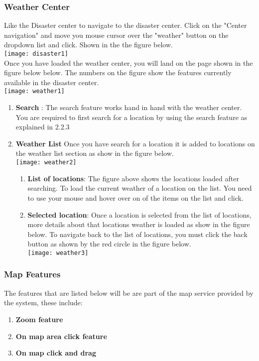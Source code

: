 \subsubsection{Weather Center}
Like the Disaster center to navigate to the disaster center. Click on the "Center navigation" and move you mouse cursor over the "weather" button on the dropdown list and click. Shown in the the figure below. \\[0.5cm]
\texttt{[image: disaster1]} \\[0.5cm]
Once you have loaded the weather center, you will land on the page shown in the figure below below. The numbers on the figure show the features currently available in the disaster center. \\[0.5cm]
\texttt{[image: weather1]} \\[0.5cm]
	\begin{enumerate}
		\item \textbf{Search} : The search feature works hand in hand with the weather center. You are required to first search for a location by using the search feature as explained in 2.2.3
		\item \textbf{Weather List}
		Once you have search for a location it is added to locations on the weather list section as show in the figure below. \\[0.5cm]
		\texttt{[image: weather2]} \\[0.5cm]
		\begin{enumerate}
		\item \textbf{List of locations}: The figure above shows the locations loaded after searching. To load the current weather of a location on the list. You need to use your mouse and hover over on of the items on the list and click. 
		\item \textbf{Selected location}: Once a location is selected from the list of locations, more details about that locations weather is loaded as show in the figure below. To navigate back to the list of locations, you must click the back button as shown by the red circle in the figure below. \\[0.2cm]
		\texttt{[image: weather3]} \\[0.5cm]
		\end{enumerate}
	\end{enumerate}
\subsubsection{Map Features}
The features that are listed below will be are part of the map service provided by the system, these include:
\begin{enumerate}
\item \textbf{Zoom feature}
\item \textbf{On map area click feature}
\item \textbf{On map click and drag}
\end{enumerate}

